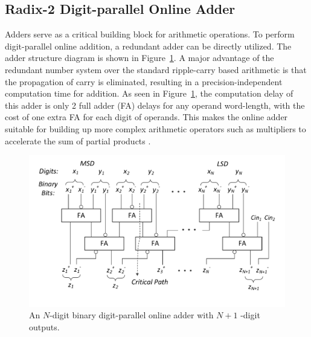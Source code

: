 \documentclass{acm_proc_article-sp}
\begin{document}
\subsection{Radix-2 Digit-parallel Online Adder}\label{subsec:OnlineAdder}
Adders serve as a critical building block for arithmetic operations. To perform digit-parallel online addition, a redundant adder can be directly utilized. The adder structure diagram is shown in Figure~\ref{Fig:Radix2SD_adder}. A major advantage of the redundant number system over the standard ripple-carry based arithmetic is that the propagation of carry is eliminated, resulting in a precision-independent computation time for addition. As seen in Figure~\ref{Fig:Radix2SD_adder}, the computation delay of this adder is only 2 full adder (FA) delays for any operand word-length, with the cost of one extra FA for each digit of operands. This makes the online adder suitable for building up more complex arithmetic operators such as multipliers to accelerate the sum of partial products \cite{RedundantMult_1987}.
%
%
\begin{figure}
\includegraphics[width=.5\textwidth]{./Figures/SDAdder.pdf}
\vspace{-8.5ex}
\caption{An $N$-digit binary digit-parallel online adder with $N+1$ -digit outputs.}
\label{Fig:Radix2SD_adder}
\end{figure}
\end{document}
